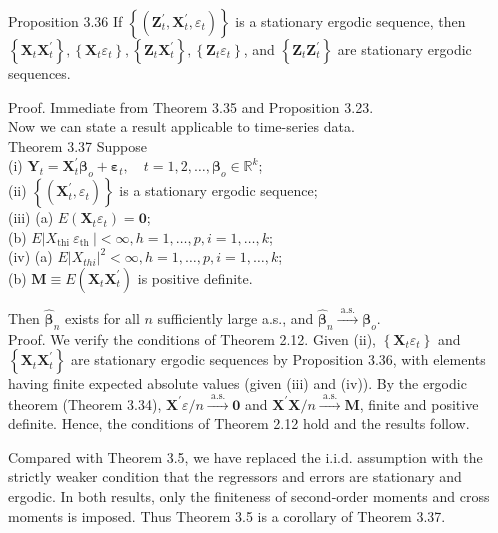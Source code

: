\documentclass[10pt]{article}
\begin{document}
Proposition 3.36 If $\left\{\left(\mathbf{Z}_{t}^{\prime}, \mathbf{X}_{t}^{\prime}, \varepsilon_{t}\right)\right\}$ is a stationary ergodic sequence, then $\left\{\mathbf{X}_{t} \mathbf{X}_{t}^{\prime}\right\},\left\{\mathbf{X}_{t} \varepsilon_{t}\right\},\left\{\mathbf{Z}_{t} \mathbf{X}_{t}^{\prime}\right\},\left\{\mathbf{Z}_{t} \varepsilon_{t}\right\}$, and $\left\{\mathbf{Z}_{t} \mathbf{Z}_{t}^{\prime}\right\}$ are stationary ergodic sequences.

Proof. Immediate from Theorem 3.35 and Proposition 3.23.\\
Now we can state a result applicable to time-series data.\\
Theorem 3.37 Suppose\\
(i) $\mathbf{Y}_{t}=\mathbf{X}_{t}^{\prime} \boldsymbol{\beta}_{o}+\boldsymbol{\varepsilon}_{t}, \quad t=1,2, \ldots, \boldsymbol{\beta}_{o} \in \mathbb{R}^{k}$;\\
(ii) $\left\{\left(\mathbf{X}_{t}^{\prime}, \varepsilon_{t}\right)\right\}$ is a stationary ergodic sequence;\\
(iii) (a) $E\left(\mathbf{X}_{t} \varepsilon_{t}\right)=\mathbf{0}$;\\
(b) $E\left|X_{\text {thi }} \varepsilon_{\text {th }}\right|<\infty, h=1, \ldots, p, i=1, \ldots, k$;\\
(iv) (a) $E\left|X_{t h i}\right|^{2}<\infty, h=1, \ldots, p, i=1, \ldots, k$;\\
(b) $\mathbf{M} \equiv E\left(\mathbf{X}_{t} \mathbf{X}_{t}^{\prime}\right)$ is positive definite.

Then $\hat{\boldsymbol{\beta}}_{n}$ exists for all $n$ sufficiently large a.s., and $\hat{\boldsymbol{\beta}}_{n} \xrightarrow{\text { a.s. }} \boldsymbol{\beta}_{o}$.\\
Proof. We verify the conditions of Theorem 2.12. Given (ii), $\left\{\mathbf{X}_{t} \varepsilon_{t}\right\}$ and $\left\{\mathbf{X}_{t} \mathbf{X}_{t}^{\prime}\right\}$ are stationary ergodic sequences by Proposition 3.36, with elements having finite expected absolute values (given (iii) and (iv)). By the ergodic theorem (Theorem 3.34), $\mathbf{X}^{\prime} \varepsilon / n \xrightarrow{\text { a.s. }} \mathbf{0}$ and $\mathbf{X}^{\prime} \mathbf{X} / n \xrightarrow{\text { a.s. }} \mathbf{M}$, finite and positive definite. Hence, the conditions of Theorem 2.12 hold and the results follow.

Compared with Theorem 3.5, we have replaced the i.i.d. assumption with the strictly weaker condition that the regressors and errors are stationary and ergodic. In both results, only the finiteness of second-order moments and cross moments is imposed. Thus Theorem 3.5 is a corollary of Theorem 3.37.
\end{document}
